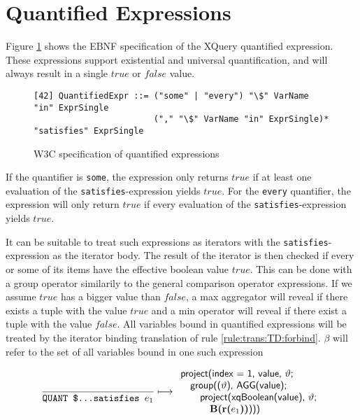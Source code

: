 \section{Quantified Expressions}
\label{sect:disc:not:quantified}

Figure \ref{fig:disc:not:quantified} shows the EBNF specification of the XQuery quantified expression. These
expressions support existential and universal quantification, and will always result in a single $true$ or $false$
value.

\begin{figure}[h]
\begin{Verbatim}
[42] QuantifiedExpr ::= ("some" | "every") "\$" VarName "in" ExprSingle 
                        ("," "\$" VarName "in" ExprSingle)* "satisfies" ExprSingle
\end{Verbatim}
\caption{W3C specification of quantified expressions \cite{w3c00} \label{fig:disc:not:quantified}}
\end{figure}

If the quantifier is \texttt{some}, the expression only returns $true$ if at least one evaluation of the
\texttt{satisfies}-expression yields $true$. For the \texttt{every} quantifier, the expression will only return
$true$ if every evaluation of the \texttt{satisfies}-expression yields $true$.

It can be suitable to treat such expressions as iterators with the \texttt{satisfies}-expression as the iterator
body. The result of the iterator is then checked if every or some of its items have the effective boolean value
$true$. This can be done with a \textsf{group} operator similarily to the general comparison operator expressions.
If we assume $true$ has a bigger value than $false$, a \textsf{max} aggregator will reveal if there exists a tuple
with the value $true$ and a \textsf{min} operator will reveal if there exist a tuple with the value $false$. All
variables bound in quantified expressions will be treated by the iterator binding translation of rule
\ref{rule:trans:TD:forbind}. $\beta$ will refer to the set of all variables bound in one such expression

\begin{equation}
\frac{}{\mbox{\texttt{QUANT \$\ldots  satisfies }}e_1} \longmapsto
\begin{array}{l}
\mbox{\textsf{project(index = 1, value, }}\vartheta\mbox{\textsf{;}} \\ \quad
\mbox{\textsf{group((}}\vartheta\mbox{\textsf{), AGG(value);}} \\ \quad\quad
\mbox{\textsf{project(xqBoolean(value), }}\vartheta\mbox{\textsf{;}} \\ \quad\quad\quad
\mbox{\textbf{B(r(}}e_1\mbox{\textbf{))}\textsf{)))}}
\end{array}
\label{rule:trans:TD:quantified}
\end{equation}

